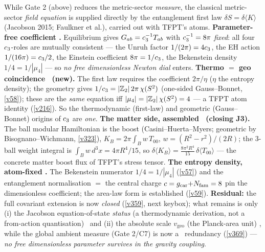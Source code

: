 \begin{keybox}
While Gate 2 (above) reduces the metric-sector \emph{measure}, the classical metric-sector \emph{field equation}
is supplied directly by the entanglement first law $\delta S=\delta\langle K\rangle$ (Jacobson 2015; Faulkner et
al.), carried out with TFPT's atoms. \textbf{Parameter-free coefficient \mE.} Equilibrium gives
$G_{ab}=c_3^{-1}T_{ab}$ with $c_3^{-1}=8\pi$ \emph{fixed}: all four $c_3$-roles are mutually
consistent --- the Unruh factor $1/(2\pi)=4c_3$, the EH action $1/(16\pi)=c_3/2$, the Einstein
coefficient $8\pi=1/c_3$, the Bekenstein density $1/4=1/|\mu_4|$ --- so \emph{no free dimensionless Newton
dial} enters. \textbf{Thermo $=$ geo coincidence \mE\ (new).} The first law requires the coefficient
$2\pi/\eta$ ($\eta$ the entropy density); the geometry gives $1/c_3=|\mathbb Z_2|\,2\pi\,\chi(S^2)$ (one-sided
Gauss--Bonnet, \vref{v58}); these are the \emph{same} equation iff $|\mu_4|=|\mathbb Z_2|\,\chi(S^2)=4$ --- a TFPT atom
identity (\vref{v216}). So the thermodynamic (first-law) and geometric (Gauss--Bonnet) origins of $c_3$ are
\emph{one}. \textbf{The matter side, assembled \mC\ (closing J3).} The ball modular Hamiltonian is the boost
(Casini--Huerta--Myers; geometric by Bisognano--Wichmann, \vref{v323}), $K_B=2\pi\!\int_B w\,T_{00}$,
$w=(R^2-r^2)/(2R)$; the $3$-ball weight integral is $\int_B w\,d^3x=4\pi R^4/15$, so
$\delta\langle K_B\rangle=\tfrac{8\pi^2R^4}{15}\,\delta\langle T_{00}\rangle$ --- the concrete matter boost flux
of TFPT's stress tensor. \textbf{The entropy density, atom-fixed \mE.} The Bekenstein numerator $1/4=1/|\mu_4|$
(\vref{v57}) and the entanglement normalisation $=$ the central charge $c=g_{\mathrm{car}}{+}N_{\mathrm{fam}}=8$ pin the dimensionless
coefficient; the area-law form is established (\vref{v59}). \textbf{Residual:} the full covariant extension
is now \emph{closed} (\vref{v359}, next keybox); what remains is only (i) the Jacobson equation-of-state
\emph{status} (a thermodynamic derivation, not a from-action quantisation) \mO\ and (ii) the absolute scale
$v_{\mathrm{geo}}$ (the Planck-area unit) \mO, while the global ambient measure (Gate 2/C7) is now a \mC\
redundancy (\vref{v369}) --- \emph{no free dimensionless parameter survives in the gravity coupling}.


\end{keybox}
